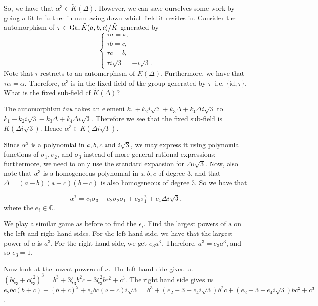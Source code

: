 So, we have that \(\alpha^3 \in \tilde K(\Delta)\). However, we can save ourselves some work
by going a little further
in narrowing down which field it resides in. Consider the automorphism of 
\(\tau \in \operatorname{Gal} \tilde K(a, b, c) / \tilde K\) generated by 
\begin{equation}
\begin{cases}
    \tau a = a,\\
    \tau b = c, \\
    \tau c = b, \\
    \tau i\sqrt{3} = -i\sqrt{3}.
\end{cases}
\end{equation}
Note that \(\tau\) restricts to an automorphism of \(\tilde K(\Delta)\). Furthermore, we have
that \(\tau \alpha = \alpha\). Therefore, \(\alpha^3\) is in the fixed field of the group
generated by \(\tau\), i.e. \(\{\text{id}, \tau\}\). What is the fixed sub-field of \(\tilde K(\Delta)\)? 

The automorphism \(tau\) takes an element \(k_1 + k_2 i\sqrt{3} + k_3 \Delta + k_4 \Delta i\sqrt{3}\) to
\(k_1 - k_2 i\sqrt{3} - k_3 \Delta + k_4 \Delta i\sqrt{3}\). Therefore we see that the fixed sub-field
is \(K(\Delta i\sqrt{3})\). Hence \(\alpha^3 \in K(\Delta i\sqrt{3})\).

Since \(\alpha^3\) is a polynomial in 
\(a, b, c\) and \(i\sqrt{3}\), we may express it using polynomial functions of
\(\sigma_1, \sigma_2\), and \(\sigma_3\) instead of more general
rational expressions; furthermore, we need to only use the standard expansion for \(\Delta i\sqrt{3}\).
Now, also note that \(\alpha^3\) is a homogeneous polynomial in \(a, b, c\) of degree 3, and that 
\(\Delta = (a - b)(a - c)(b - c)\) is also homogeneous of degree 3. So we have that

\begin{equation}
\alpha^3 = e_1 \sigma_3 + e_2 \sigma_2 \sigma_1 + e_3 \sigma_1^3
    + e_4 \Delta i\sqrt{3},
\end{equation}
where the \(e_i \in \mathbb C\).

We play a similar game as before to find the \(e_i\). Find the largest powers of \(a\) on the left and right
hand sides. For the left hand side, we have that the largest power of \(a\) is \(a^3\). For the right hand 
side, we get \(e_3 a^3\). Therefore, \(a^3 = e_3 a^3\), and so \(e_3 = 1\). 

Now look at the lowest powers of \(a\). The left hand side gives us 
\((b\zeta_3 + c\zeta_3^2)^3 = b^3 + 3\zeta_3b^2c + 3\zeta_3^2 bc^2 + c^3\). The right hand side gives us
\(e_2 bc(b + c) + (b + c)^3 + e_4 bc(b - c)i\sqrt{3}
    = b^3 + (e_2 + 3 + e_4i\sqrt{3})b^2c + (e_2 + 3 - e_4 i\sqrt{3})bc^2 + c^3\).

